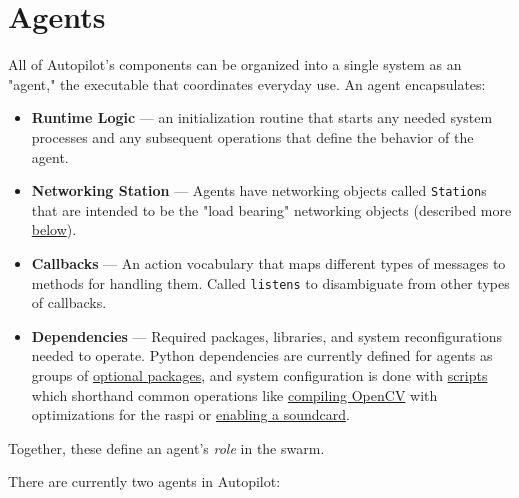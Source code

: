 \section{Agents}
\label{sec:agents}

All of Autopilot's components can be organized into a single system as an "agent," the executable that coordinates everyday use. An agent encapsulates:

\begin{itemize}
\item \textbf{Runtime Logic} --- an initialization routine that starts any needed system processes and any subsequent operations that define the behavior of the agent.
\item \textbf{Networking Station} --- Agents have networking objects called \texttt{Station}s that are intended to be the "load bearing" networking objects (described more \hyperref[sec:networking]{below}).
\item \textbf{Callbacks} --- An action vocabulary that maps different types of messages to methods for handling them. Called \texttt{listens} to disambiguate from other types of callbacks.
\item \textbf{Dependencies} --- Required packages, libraries, and system reconfigurations needed to operate. Python dependencies are currently defined for agents as groups of \href{https://peps.python.org/pep-0621/\#dependencies-optional-dependencies}{optional packages}, and system configuration is done with \href{https://docs.auto-pi-lot.com/en/latest/setup/scripts.html}{scripts} which shorthand common operations like \href{https://github.com/auto-pi-lot/autopilot/blob/90956187d4222f16f67ab8b39b8359da954d5dcc/autopilot/setup/scripts.py\#L140-L183}{compiling OpenCV} with optimizations for the raspi or \href{https://github.com/auto-pi-lot/autopilot/blob/90956187d4222f16f67ab8b39b8359da954d5dcc/autopilot/setup/scripts.py\#L92-L100}{enabling a soundcard}.
\end{itemize}

Together, these define an agent's \textit{role} in the swarm.

\clearpage

There are currently two agents in Autopilot: 

